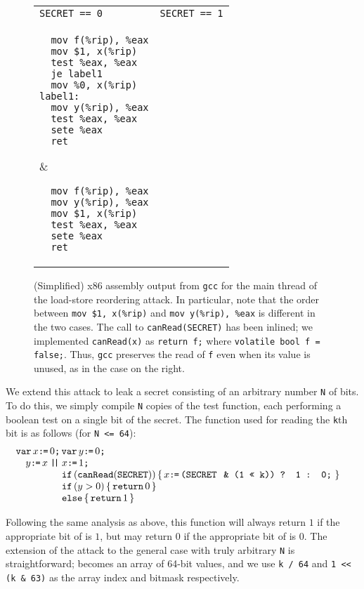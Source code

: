 \begin{figure}
  \begin{tabular}[fragile]{p{3cm} | p{3cm}}
    \texttt{SECRET == 0} & \texttt{SECRET == 1} \\
\begin{verbatim}
  mov f(%rip), %eax
  mov $1, x(%rip)
  test %eax, %eax
  je label1
  mov %0, x(%rip)
label1:
  mov y(%rip), %eax
  test %eax, %eax
  sete %eax
  ret
\end{verbatim}
  &
\begin{verbatim}
  mov f(%rip), %eax
  mov y(%rip), %eax
  mov $1, x(%rip)
  test %eax, %eax
  sete %eax
  ret
\end{verbatim}
  \\
  \end{tabular}
  \caption{
    (Simplified) x86 assembly output from \texttt{gcc} for the main thread of
    the load-store reordering attack.
    In particular, note that the order between \texttt{mov \$1, x(\%rip)}
    and \texttt{mov y(\%rip), \%eax} is different in the two cases.
    The call to \texttt{canRead(SECRET)} has been inlined; we implemented
    \texttt{canRead(x)} as \texttt{return f;} where
    \texttt{volatile bool f = false;}.
    Thus, \texttt{gcc} preserves the read of \texttt{f} even when its value is
    unused, as in the case on the right.
  }
  \label{fig:lsr-asm}
\end{figure}

We extend this attack to leak a secret consisting of an arbitrary number
\verb|N| of bits.
To do this, we simply compile \verb|N| copies of the test function, each
performing a boolean test on a single bit of the secret.
The function used for reading the \verb|k|th bit is as follows (for
\verb|N <= 64|):
\[\begin{array}[t]{@{}l}
  \VAR x\GETS0\SEMI \VAR y\GETS0\SEMI\\\quad
    y\GETS x
  \PAR\begin{array}[t]{@{}l}
    x\GETS 1\SEMI\\
    \IF(\CANREAD(\SEC))\THEN x\GETS\texttt{(\SEC\, \& (1 << k)) ? 1 : 0}\SEMI\FI\\
    \IF(y > 0)\THEN \RETURN 0
    \brELSE \RETURN 1\FI
\end{array}\end{array}\]
Following the same analysis as above, this function will always return $1$
if the appropriate bit of {\SEC} is $1$, but may return $0$ if
the appropriate bit of {\SEC} is $0$.
The extension of the attack to the general case with truly arbitrary \verb|N|
is straightforward; {\SEC} becomes an array of 64-bit values, and we use
\verb|k / 64| and \verb|1 << (k & 63)| as the array index and bitmask
respectively.

